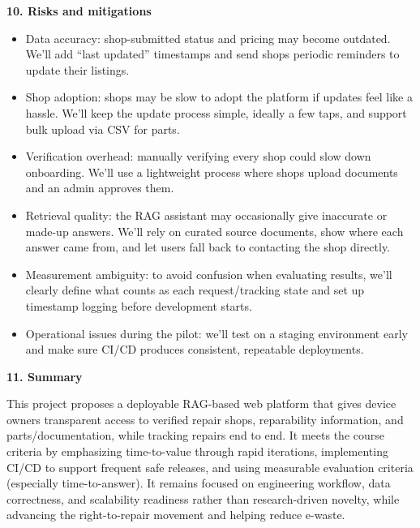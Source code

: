 \documentclass[11pt]{article}
\newcommand{\secheadonly}[1]{%
  \vspace{0.35cm}\noindent
  {\large\bfseries #1}\par
  \vspace{0.15cm}
}
\begin{document}
\secheadonly{10. Risks and mitigations}
\begin{itemize}
  \item Data accuracy: shop-submitted status and pricing may become outdated. We'll add ``last updated'' timestamps and send shops periodic reminders to update their listings.
  \item Shop adoption: shops may be slow to adopt the platform if updates feel like a hassle. We'll keep the update process simple, ideally a few taps, and support bulk upload via CSV for parts.
  \item Verification overhead: manually verifying every shop could slow down onboarding. We'll use a lightweight process where shops upload documents and an admin approves them.
  \item Retrieval quality: the RAG assistant may occasionally give inaccurate or made-up answers. We'll rely on curated source documents, show where each answer came from, and let users fall back to contacting the shop directly.
  \item Measurement ambiguity: to avoid confusion when evaluating results, we'll clearly define what counts as each request/tracking state and set up timestamp logging before development starts.
  \item Operational issues during the pilot: we'll test on a staging environment early and make sure CI/CD produces consistent, repeatable deployments.
\end{itemize}

\secheadonly{11. Summary}
This project proposes a deployable RAG-based web platform that gives device owners transparent access to verified repair shops, reparability information, and parts/documentation, while tracking repairs end to end. It meets the course criteria by emphasizing time-to-value through rapid iterations, implementing CI/CD to support frequent safe releases, and using measurable evaluation criteria (especially time-to-answer). It remains focused on engineering workflow, data correctness, and scalability readiness rather than research-driven novelty, while advancing the right-to-repair movement and helping reduce e-waste.
\end{document}
